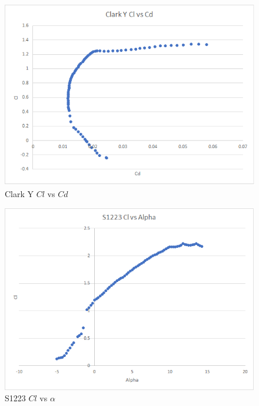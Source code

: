 \documentclass{article}
\begin{document}
\begin{figure}[!h]
\begin{center}
	\includegraphics[scale=1.1]{clarkyclvscd.png}
	\caption{Clark Y $Cl$ vs $Cd$}
	\label{Figure 4:}
\end{center}
\end{figure}

\newpage
\begin{figure}[!h]
\begin{center}
	\includegraphics[scale=1]{s1223clvsalpha.png}
	\caption{S1223 $Cl$ vs $\alpha$}
	\label{Figure 5:}
\end{center}
\end{figure}
\end{document}
